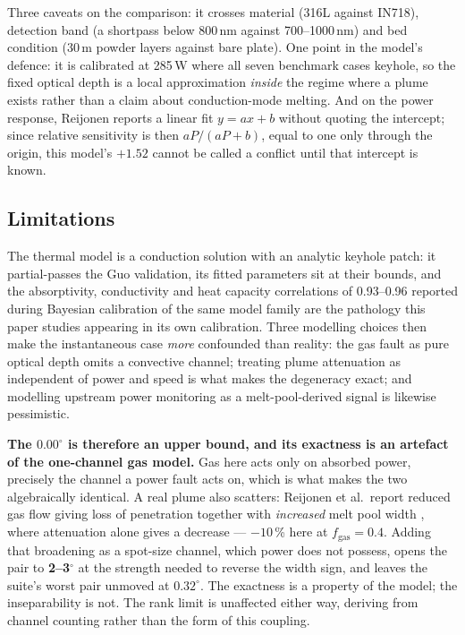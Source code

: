\documentclass[preprint,times]{elsarticle}
\begin{document}
Three caveats on the comparison: it crosses material (316L against IN718),
detection band (a shortpass below 800\,nm against 700--1000\,nm) and bed
condition (30\,\textmu m powder layers against bare plate). One point in the
model's defence: it is calibrated at 285\,W where all seven benchmark cases
keyhole, so the fixed optical depth is a local approximation \emph{inside} the
regime where a plume exists rather than a claim about conduction-mode melting.
And on the power response, Reijonen reports a linear fit $y=ax+b$ without
quoting the intercept; since relative sensitivity is then $aP/(aP+b)$, equal to
one only through the origin, this model's $+1.52$ cannot be called a conflict
until that intercept is known.

\subsection{Limitations}
\label{sec:limits}

The thermal model is a conduction solution with an analytic keyhole patch: it
partial-passes the Guo validation, its fitted parameters sit at their bounds, and
the absorptivity, conductivity and heat capacity correlations of 0.93--0.96
reported during Bayesian calibration of the same model family \cite{Hon2021} are
the pathology this paper studies appearing in its own calibration. Three
modelling choices then make the instantaneous case \emph{more} confounded than
reality: the gas fault as pure optical depth omits a convective channel; treating
plume attenuation as independent of power and speed is what makes the degeneracy
exact; and modelling upstream power monitoring as a melt-pool-derived signal is
likewise pessimistic.

\textbf{The $0.00^\circ$ is therefore an upper bound, and its exactness is an
artefact of the one-channel gas model.} Gas here acts only on absorbed power,
precisely the channel a power fault acts on, which is what makes the two
algebraically identical. A real plume also scatters: Reijonen et al.\ report
reduced gas flow giving loss of penetration together with \emph{increased} melt
pool width \cite{Reijonen2020}, where attenuation alone gives a decrease ---
$-10$\,\% here at $f_{\mathrm{gas}}=0.4$. Adding that broadening as a spot-size
channel, which power does not possess, opens the pair to \textbf{2--3$^\circ$}
at the strength needed to reverse the width sign, and leaves the suite's worst
pair unmoved at $0.32^\circ$. The exactness is a property of the model; the
inseparability is not. The rank limit is unaffected either way, deriving from
channel counting rather than the form of this coupling.
\end{document}
